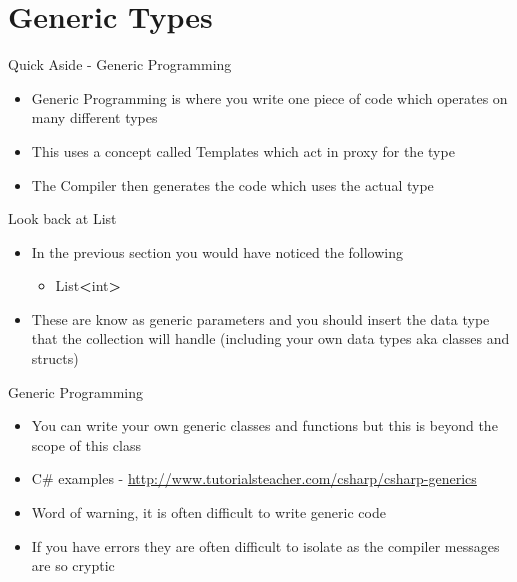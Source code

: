 \part{Generic Types}
\frame{\partpage}

\begin{frame}{Quick Aside - Generic Programming}
	\begin{itemize}
		\pause \item Generic Programming is where you write one piece of code which operates on many different types
		\pause \item This uses a concept called Templates which act in proxy for the type
		\pause \item The Compiler then generates the code which uses the actual type
	\end{itemize}
\end{frame}

\begin{frame}{Look back at List}
	\begin{itemize}
		\pause \item In the previous section you would have noticed the following
		\begin{itemize}
			\pause \item List\textbf{\textless}int\textbf{\textgreater} 
		\end{itemize} 
		\pause \item These are know as generic parameters and you should insert the data type that the collection will handle (including your own data types aka classes and structs)
	\end{itemize}
\end{frame}

\begin{frame}{Generic Programming}
	\begin{itemize}
		\pause \item You can write your own generic classes and functions but this is beyond the scope of this class
		\pause \item C\# examples -
		\url{http://www.tutorialsteacher.com/csharp/csharp-generics}
		\pause \item Word of warning, it is often difficult to write generic code
		\pause \item If you have errors they are often difficult to isolate as the compiler messages are so cryptic
	\end{itemize}
\end{frame}